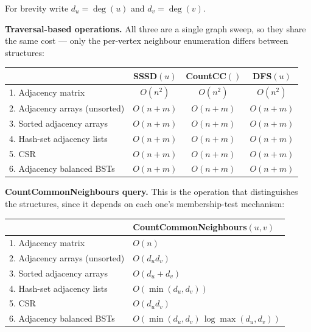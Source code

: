 \documentclass[11pt]{article}
\begin{document}
For brevity write $d_u=\deg(u)$ and $d_v=\deg(v)$.

\medskip
\noindent\textbf{Traversal-based operations.} All three are a single graph sweep, so they
share the same cost --- only the per-vertex neighbour enumeration differs between structures:
\begin{center}
\begin{tabular}{l c c c}
\toprule
\rowcolor{white}
 & \textbf{SSSD$(u)$} & \textbf{CountCC$()$} & \textbf{DFS$(u)$} \\
\midrule
1. Adjacency matrix & $O(n^2)$ & $O(n^2)$ & $O(n^2)$ \\
2. Adjacency arrays (unsorted) & $O(n + m)$ & $O(n + m)$ & $O(n + m)$ \\
3. Sorted adjacency arrays & $O(n + m)$ & $O(n + m)$ & $O(n + m)$ \\
4. Hash-set adjacency lists & $O(n + m)$ & $O(n + m)$ & $O(n + m)$ \\
5. CSR & $O(n + m)$ & $O(n + m)$ & $O(n + m)$ \\
6. Adjacency balanced BSTs & $O(n + m)$ & $O(n + m)$ & $O(n + m)$ \\
\bottomrule
\end{tabular}
\end{center}

\begin{minipage}{\linewidth}
\noindent\textbf{CountCommonNeighbours query.} This is the operation that distinguishes the
structures, since it depends on each one's membership-test mechanism:
\begin{center}
\begin{tabular}{l l}
\toprule
\rowcolor{white}
 & \textbf{CountCommonNeighbours$(u,v)$} \\
\midrule
1. Adjacency matrix & $O(n)$ \\
2. Adjacency arrays (unsorted) & $O(d_u d_v)$ \\
3. Sorted adjacency arrays & $O(d_u+d_v)$ \\
4. Hash-set adjacency lists & $O(\min(d_u,d_v))$ \\
5. CSR & $O(d_u d_v)$ \\
6. Adjacency balanced BSTs & $O(\min(d_u,d_v)\,\log\max(d_u,d_v))$ \\
\bottomrule
\end{tabular}
\end{center}
\end{minipage}
\end{document}
